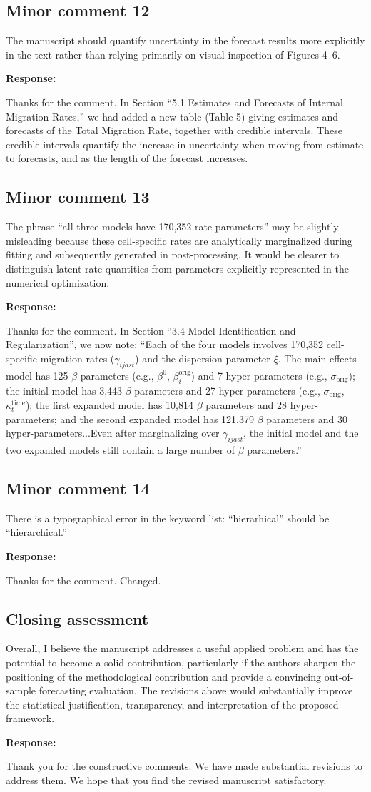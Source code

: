 \documentclass[11pt,a4paper]{article}
\newlength{\replyspace}
\newenvironment{response}{\par\addvspace{\replyspace}\nopagebreak\textbf{\textcolor{replyblue}{Response:}}\par\begingroup\color{replyblue}}{\par\endgroup\vspace{\replyspace}}
\newcommand{\refcomment}[2]{\par\Needspace{5\baselineskip}\subsection*{#1}#2\par}
\begin{document}
\refcomment{Minor comment 12}{
The manuscript should quantify uncertainty in the forecast results more explicitly in the text rather than relying primarily on visual inspection of Figures 4--6.
}
\begin{response}
Thanks for the comment. {\color{magenta}In Section ``5.1 Estimates and Forecasts of Internal Migration Rates,''} {\color{cyan}we had added a new table (Table 5) giving estimates and forecasts of the Total Migration Rate, together with credible intervals. These credible intervals quantify the increase in uncertainty when moving from estimate to forecasts, and as the length of the forecast increases.}
\end{response}

\refcomment{Minor comment 13}{
The phrase ``all three models have 170,352 rate parameters'' may be slightly misleading because these cell-specific rates are analytically marginalized during fitting and subsequently generated in post-processing. It would be clearer to distinguish latent rate quantities from parameters explicitly represented in the numerical optimization.
}
\begin{response}
Thanks for the comment. In Section ``3.4 Model Identification and Regularization'', we now note: ``Each of the four models involves 170,352 cell-specific migration rates ($\gamma_{ijast}$) and the dispersion parameter $\xi$. The main effects model has 125 $\beta$ parameters (e.g., $\beta^0$, $\beta_i^{\text{orig}}$) and 7 hyper-parameters (e.g., $\sigma_{\text{orig}}$); the initial model has 3,443 $\beta$ parameters and 27 hyper-parameters (e.g., $\sigma_{\text{orig}}$, $\kappa_t^{\text{time}}$); the first expanded model has 10,814 $\beta$ parameters and 28 hyper-parameters; and the second expanded model has 121,379 $\beta$ parameters and 30 hyper-parameters...Even after marginalizing over $\gamma_{ijast}$, the initial model and the two expanded models still contain a large number of $\beta$ parameters.''
\end{response}

\refcomment{Minor comment 14}{
There is a typographical error in the keyword list: ``hierarhical'' should be ``hierarchical.''
}
\begin{response}
Thanks for the comment. Changed.\end{response}

\refcomment{Closing assessment}{
Overall, I believe the manuscript addresses a useful applied problem and has the potential to become a solid contribution, particularly if the authors sharpen the positioning of the methodological contribution and provide a convincing out-of-sample forecasting evaluation. The revisions above would substantially improve the statistical justification, transparency, and interpretation of the proposed framework.
}
\begin{response}
Thank you for the constructive comments. We have made substantial revisions to address them. We hope that you find the revised manuscript satisfactory.
\end{response}
\end{document}
